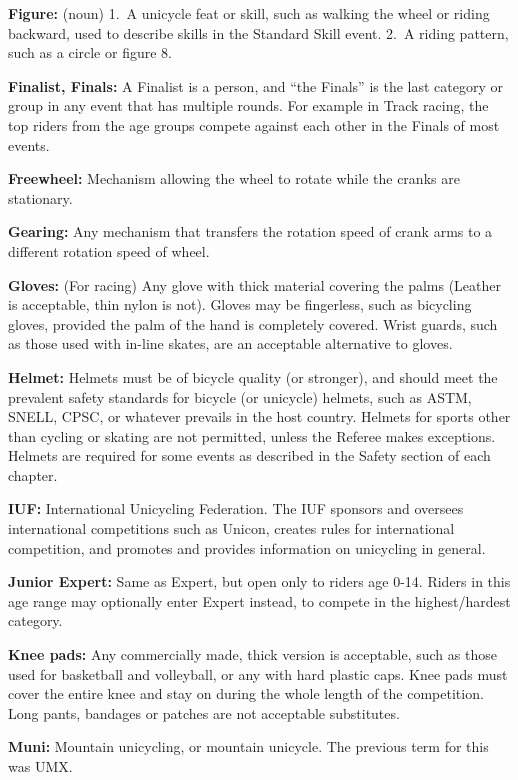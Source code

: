 \textbf{Figure:} (noun) 1.~A unicycle feat or skill, such as walking the wheel or riding backward, used to describe skills in the Standard Skill event.
2.~A riding pattern, such as a circle or figure 8.

\textbf{Finalist, Finals:} A Finalist is a person, and ``the Finals'' is the last category or group in any event that has multiple rounds.
For example in Track racing, the top riders from the age groups compete against each other in the Finals of most events.

\textbf{Freewheel:} Mechanism allowing the wheel to rotate while the cranks are stationary.

\textbf{Gearing:} Any mechanism that transfers the rotation speed of crank arms to a different rotation speed of wheel.

\textbf{Gloves:} (For racing) Any glove with thick material covering the palms (Leather is acceptable, thin nylon is not).
Gloves may be fingerless, such as bicycling gloves, provided the palm of the hand is completely covered.
Wrist guards, such as those used with in-line skates, are an acceptable alternative to gloves.

\textbf{Helmet:} Helmets must be of bicycle quality (or stronger), and should meet the prevalent safety standards for bicycle (or unicycle) helmets, such as ASTM, SNELL, CPSC, or whatever prevails in the host country.
Helmets for sports other than cycling or skating are not permitted, unless the Referee makes exceptions.
Helmets are required for some events as described in the Safety section of each chapter.

\textbf{IUF:} International Unicycling Federation.
The IUF sponsors and oversees international competitions such as Unicon, creates rules for international competition, and promotes and provides information on unicycling in general.

\textbf{Junior Expert:} Same as Expert, but open only to riders age 0-14.
Riders in this age range may optionally enter Expert instead, to compete in the highest/hardest category.

\textbf{Knee pads:} Any commercially made, thick version is acceptable, such as those used for basketball and volleyball, or any with hard plastic caps.
Knee pads must cover the entire knee and stay on during the whole length of the competition.
Long pants, bandages or patches are not acceptable substitutes.

\textbf{Muni:} Mountain unicycling, or mountain unicycle.
The previous term for this was UMX.

